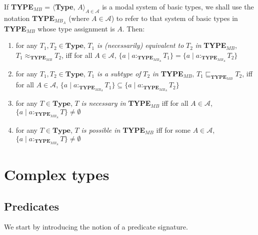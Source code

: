 If {\bf TYPE$_{\mathit{MB}}$} = $\langle${\bf Type},
$A\rangle_{A\in\mathcal{A}}$
is a modal system of basic types, we shall use the notation {\bf
  TYPE$_{\mathit{MB}_A}$} (where $A\in\mathcal{A}$) to refer to that
system of basic types in {\bf TYPE$_{\mathit{MB}}$} whose type assignment is
$A$.    Then:  
\begin{enumerate} 
 
\item for any $T_1,T_2\in\textbf{Type}$, $T_1$ \textit{is
    (necessarily) equivalent
    to} $T_2$ \textit{in} {\bf TYPE$_{\mathit{MB}}$},
  $T_1\approx_{\mathbf{TYPE_{\mathit{MB}}}}T_2$,  iff for all
  $A\in\mathcal{A}$, $\{a\mid a:_{\mathbf{TYPE}_{\mathit{MB}_A}}T_1\}=\{a\mid a:_{\mathbf{TYPE}_{\mathit{MB}_A}}T_2\}$
  
 
\item for any $T_1,T_2\in\textbf{Type}$, $T_1$ \textit{is a
    subtype of} $T_2$ \textit{in} {\bf TYPE$_{\mathit{MB}}$},
  $T_1\sqsubseteq_{\mathbf{TYPE_{\mathit{MB}}}}T_2$,  iff for all
  $A\in\mathcal{A}$, $\{a\mid a:_{\mathbf{TYPE}_{\mathit{MB}_A}}T_1\}\subseteq\{a\mid a:_{\mathbf{TYPE}_{\mathit{MB}_A}}T_2\}$

\item for any $T\in\textbf{Type}$, $T$ \textit{is necessary in} {\bf TYPE$_{\mathit{MB}}$}  iff for all
  $A\in\mathcal{A}$, \\ $\{a\mid a:_{\mathbf{TYPE}_{\mathit{MB}_A}}T\}\not=\emptyset$

\item for any $T\in\textbf{Type}$, $T$ \textit{is possible in} {\bf TYPE$_{\mathit{MB}}$}  iff for some
  $A\in\mathcal{A}$, \\ $\{a\mid a:_{\mathbf{TYPE}_{\mathit{MB}_A}}T\}\not=\emptyset$
 
\end{enumerate}  

\section{Complex types}

\subsection{Predicates}
\label{app:predicates}
We start by introducing the notion of a predicate signature.

